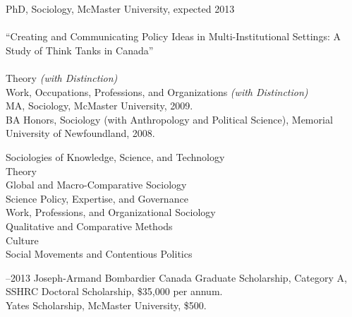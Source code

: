 \documentclass[11pt,usenames,dvipsnames]{article}
\begin{document}
\bigskip

\reversemarginpar

\medskip 

\medskip 
{}

\noindent PhD, Sociology, McMaster University, expected 2013\\ 

\\ 
``Creating and Communicating Policy Ideas in Multi-Institutional Settings: A Study of Think Tanks in Canada''\\

\\
Theory {\it (with Distinction)}\\
Work, Occupations, Professions, and Organizations {\it (with Distinction)}\\

\noindent MA, Sociology, McMaster University, 2009.\\

\noindent BA Honors, Sociology (with Anthropology and Political Science), Memorial University of Newfoundland, 2008.\\



\noindent Sociologies of Knowledge, Science, and Technology\\
Theory\\
Global and Macro-Comparative Sociology \\
Science Policy, Expertise, and Governance \\
Work, Professions, and Organizational Sociology\\ 
Qualitative and Comparative Methods\\ 
Culture \\
Social Movements and Contentious Politics\\



–2013 Joseph-Armand Bombardier Canada Graduate Scholarship, Category A, SSHRC Doctoral Scholarship, \$35,000 per annum.\\

 Yates Scholarship, McMaster University, \$500.\\
\end{document}
